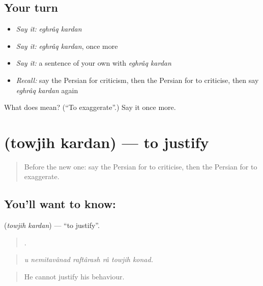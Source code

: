 \subsection*{Your turn}
\begin{itemize}
\raggedright
  \item \emph{Say it:} \emph{eghrâq kardan}
  \item \emph{Say it:} \emph{eghrâq kardan}, once more
  \item \emph{Say it:} a sentence of your own with \emph{eghrâq kardan}
  \item \emph{Recall:} say the Persian for criticism, then the Persian for to criticise, then say \emph{eghrâq kardan} again
\end{itemize}

\begin{tcolorbox}[breakable,colback=teal!4,colframe=teal!35!black,title={Before you move on}]
What does   mean? (\textquotedblleft{}To exaggerate\textquotedblright{}.) Say it once more.
\end{tcolorbox}
\section[\texorpdfstring{\fa{توجیه} \fa{کردن} (towjih kardan)}{توجیه کردن (towjih kardan)}]{  (towjih kardan) — to justify}

\label{lesson:FA-C365-towjih-kardan}



\begin{quote}
Before the new one: say the Persian for to criticise, then the Persian for to exaggerate.
\end{quote}

\subsection*{You'll want to know:  }
\textbf{ } (\emph{towjih kardan}) — \textquotedblleft{}to justify\textquotedblright{}.

\begin{quote}
     .
\end{quote}

\begin{quote}
\emph{u nemitavânad raftârash râ towjih konad.}
\end{quote}

\begin{quote}
He cannot justify his behaviour.
\end{quote}

